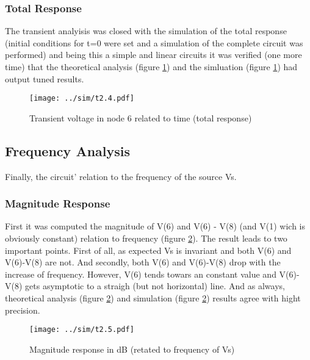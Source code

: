 \subsubsection{Total Response}

The transient analyisis was closed with the simulation of the total response (initial conditions for t=0 were set and a simulation of the complete circuit was performed) and being this a simple and linear circuits it was verified (one more time) that the theoretical analysis (figure \ref{fig:trans2}) and the simluation (figure \ref{fig:trans2}) had output tuned results.

\begin{figure}[h] \centering
\texttt{[image: ../sim/t2.4.pdf]}
\caption{Transient voltage in node 6 related to time (total response)}
\label{fig:trans2}
\end{figure}





\subsection{Frequency Analysis}

Finally, the circuit' relation to the frequency of the source Vs.

\subsubsection{Magnitude Response}

First it was computed the magnitude of V(6) and V(6) - V(8) (and V(1) wich is obviously constant) relation to frequency (figure \ref{fig:acm}). The result leads to two important points. First of all, as expected Vs is invariant and both V(6) and V(6)-V(8) are not. And secondly, both V(6) and V(6)-V(8) drop with the increase of frequency. However, V(6) tends towars an constant value and V(6)-V(8) gets asymptotic to a straigh (but not horizontal) line. And as always, theoretical analysis (figure \ref{fig:acm}) and simulation (figure \ref{fig:acm}) results agree with hight precision.

\begin{figure}[h] \centering
\texttt{[image: ../sim/t2.5.pdf]}
\caption{Magnitude response in dB (retated to frequency of Vs)}
\label{fig:acm}
\end{figure}


